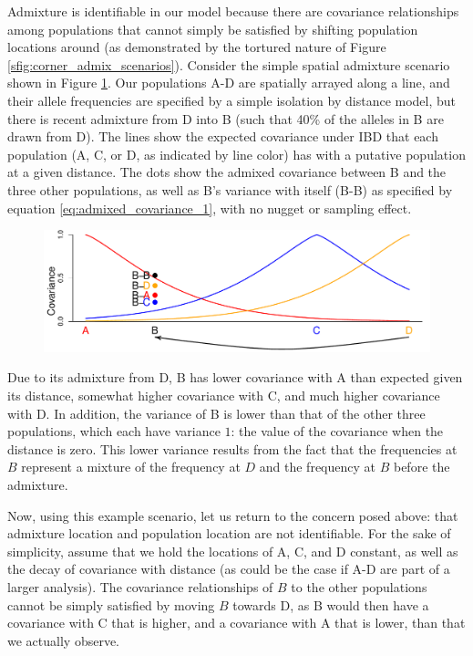 \documentclass[12pt]{article}
\begin{document}
Admixture is identifiable in our model because there are covariance relationships among populations that cannot simply be satisfied by shifting population locations around (as demonstrated by the tortured nature of Figure \ref{sfig:corner_admix_scenarios}). Consider the simple spatial admixture scenario shown in Figure \ref{sfig:toy_admixture}. Our populations A-D are spatially arrayed  along a line, and their allele frequencies are specified by a simple isolation by distance model, but there is recent admixture from D into B (such that 40\% of the alleles in B are drawn from D).  The lines show the expected covariance under IBD that each population (A, C, or D, as indicated by line color) has with a putative population at a given distance.  The dots show the admixed covariance between B and the three other populations, as well as B's variance with itself (B-B) as specified by equation \eqref{eq:admixed_covariance_1}, with no nugget or sampling effect.

\begin{figure}[htp!]
	\centering
	\includegraphics[width=\textwidth]{figs/sims/Admix_covar_toy_fig.pdf}
	\caption{} \label{sfig:toy_admixture}
\end{figure}

Due to its admixture from D, B has lower covariance with A than expected given its distance, somewhat higher covariance with C, and much higher covariance with D. In addition, the variance of B is lower than that of the other three populations, which each have variance $1$: the value of the covariance when the distance is zero. This lower variance results from the fact that the frequencies at $B$ represent a mixture of the frequency at $D$ and the frequency at $B$ before the admixture. 

Now, using this example scenario, let us return to the concern posed above: that admixture location and population location are not identifiable.  For the sake of simplicity, assume that we hold the locations of A, C, and D constant, as well as the decay of covariance with distance (as could be the case if A-D are part of a larger analysis).  The covariance relationships of $B$ to the other populations cannot be simply satisfied by moving $B$ towards D, as B would then have a covariance with C that is higher, and a covariance with A that is lower, than that we actually observe. 
\end{document}
